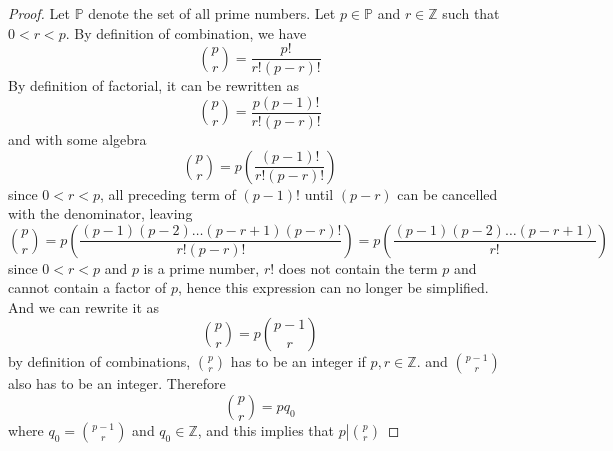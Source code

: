 \documentclass[12pt]{article}
\newcommand{\Z}{\mathbb{Z}}
\newcommand{\paren}[1]{\left( #1 \right)}
\begin{document}
\begin{enumerate}
        \begin{proof}
        Let \( \mathbb{P} \) denote the set of all prime numbers. Let \( p \in \mathbb{P} \) and \( r \in \mathbb{Z} \) such that \( 0 < r < p \). By definition of combination, we have
        \[
        {p \choose r} = \frac{p!}{r!(p-r)!}
        \]
        By definition of factorial, it can be rewritten as
        \[
        {p \choose r} = \frac{p(p-1)!}{r!(p-r)!}
        \]
        and with some algebra
        \[
         {p \choose r} = p\paren{\frac{(p-1)!}{r!(p-r)!}}
        \]
        since $0<r<p$, all preceding term of $(p-1)!$ until $(p-r)$ can be cancelled with the denominator, leaving
        \[
        {p \choose r} = p\paren{\frac{(p-1)(p-2)\ldots (p-r+1)(p-r)!}{r!(p-r)!}} = 
        p\paren{\frac{(p-1)(p-2)\ldots (p-r+1)}{r!}}
        \]
        since $0<r<p$ and $p$ is a prime number, $r!$ does not contain the term $p$ and cannot contain a factor of $p$, hence this expression can no longer be simplified. And we can rewrite it as
        \[
        {p \choose r} = p {p-1 \choose r}
        \]
        by definition of combinations, ${p \choose r}$ has to be an integer if $p,r \in \Z$. and ${p-1 \choose r}$ also has to be an integer. Therefore
        \[
        {p \choose r} = pq_0
        \]
        where $q_0 = {p-1 \choose r} $ and $q_0 \in \Z$, and this implies that $ p \left| {p \choose r} \right.$
\end{proof}



        
\end{enumerate}
\end{document}
